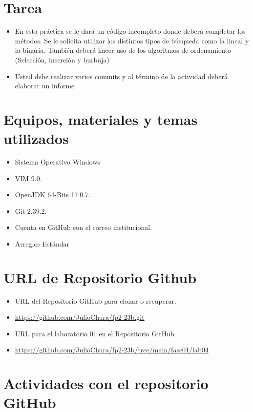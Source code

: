 \documentclass{article}
\begin{document}
	\section{Tarea}
	\begin{itemize}		
		\item 
		En esta práctica se le dará un código incompleto donde deberá completar los métodos. Se le solicita utilizar los distintos tipos de búsqueda como la lineal y la binaria. También deberá hacer uso de los algoritmos de ordenamiento (Selección, inserción y burbuja)
		\item Usted debe realizar varios commits y al término de la actividad deberá elaborar un informe
		
	\end{itemize}
	
	\section{Equipos, materiales y temas utilizados}
	\begin{itemize}
		\item Sistema Operativo Windows
		\item VIM 9.0.
		\item OpenJDK 64-Bits 17.0.7.
		\item Git 2.39.2.
		\item Cuenta en GitHub con el correo institucional.
		\item Arreglos Estándar
	\end{itemize}
	
	\section{URL de Repositorio Github}
	\begin{itemize}
		\item URL del Repositorio GitHub para clonar o recuperar.
		\item \url{https://github.com/JulioChura/fp2-23b.git}
		\item URL para el laboratorio 01 en el Repositorio GitHub.
		\item \url{https://github.com/JulioChura/fp2-23b/tree/main/fase01/lab04}
	\end{itemize}
	
	\section{Actividades con el repositorio GitHub}
	
\end{document}

